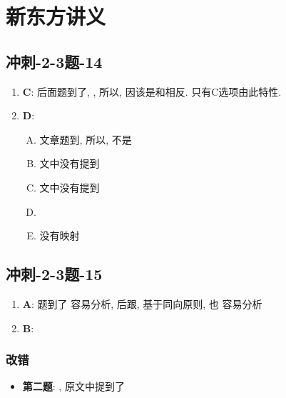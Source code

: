 \chapter{新东方讲义}

\section{冲刺-2-3题-14}

  \begin{enumerate}
    \item \textbf{C}: 后面题到了, , 所以,
    因该是和相反. 只有C选项由此特性.

    \item \textbf{D}:
    \begin{enumerate}[A.]
      \item 文章题到, 所以, 不是
      \item 文中没有提到
      \item 文中没有提到
      \item %
      \item {}没有映射
    \end{enumerate}
  \end{enumerate}

\section{冲刺-2-3题-15}

  \begin{enumerate}
    \item \textbf{A}: 题到了
    容易分析, 后跟, 基于同向原则, 也
    容易分析
    \item \textbf{B}: 
  \end{enumerate}

  \subsection{改错}

    \begin{itemize}
      \item \textbf{第二题}: , 原文中提到了
    \end{itemize}

